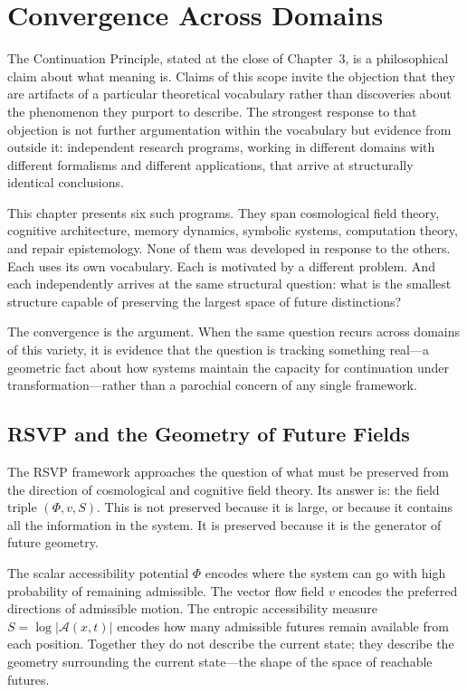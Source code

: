 \documentclass[12pt, oneside]{book}
\theoremstyle{flyxion}
\theoremstyle{definition}
\begin{document}
\bigskip

\chapter{Convergence Across Domains}

The Continuation Principle, stated at the close of Chapter~3, is
a philosophical claim about what meaning is. Claims of this scope
invite the objection that they are artifacts of a particular
theoretical vocabulary rather than discoveries about the phenomenon
they purport to describe. The strongest response to that objection
is not further argumentation within the vocabulary but evidence from
outside it: independent research programs, working in different
domains with different formalisms and different applications, that
arrive at structurally identical conclusions.

This chapter presents six such programs. They span cosmological field
theory, cognitive architecture, memory dynamics, symbolic systems,
computation theory, and repair epistemology. None of them was
developed in response to the others. Each uses its own vocabulary.
Each is motivated by a different problem. And each independently
arrives at the same structural question: what is the smallest
structure capable of preserving the largest space of future
distinctions?

The convergence is the argument. When the same question recurs
across domains of this variety, it is evidence that the question
is tracking something real---a geometric fact about how systems
maintain the capacity for continuation under transformation---rather
than a parochial concern of any single framework.

\section{RSVP and the Geometry of Future Fields}

The RSVP framework approaches the question of what must be preserved
from the direction of cosmological and cognitive field theory. Its
answer is: the field triple $(\Phi, v, S)$. This is not preserved
because it is large, or because it contains all the information in
the system. It is preserved because it is the generator of future
geometry.

The scalar accessibility potential $\Phi$ encodes where the system
can go with high probability of remaining admissible. The vector
flow field $v$ encodes the preferred directions of admissible
motion. The entropic accessibility measure $S = \log|\mathcal{A}(x,t)|$
encodes how many admissible futures remain available from each
position. Together they do not describe the current state; they
describe the geometry surrounding the current state---the shape of
the space of reachable futures.
\end{document}
